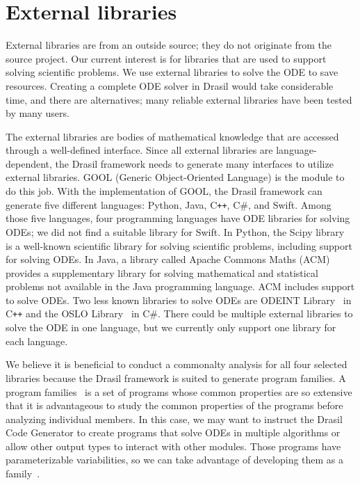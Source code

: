 \chapter{External libraries}
\label{cha_extlib}
External libraries are from an outside source; they do not originate from the source project. Our current interest is for libraries that are used to support solving scientific problems. We use external libraries to solve the ODE to save resources. Creating a complete ODE solver in Drasil would take considerable time, and there are alternatives; many reliable external libraries have been tested by many users. 

The external libraries are bodies of mathematical knowledge that are accessed through a well-defined interface. Since all external libraries are language-dependent, the Drasil framework needs to generate many interfaces to utilize external libraries. GOOL (Generic Object-Oriented Language) is the module to do this job. With the implementation of GOOL, the Drasil framework can generate five different languages: Python, Java, C\texttt{++}, C\#, and Swift. Among those five languages, four programming languages have ODE libraries for solving ODEs; we did not find a suitable library for Swift. In Python, the Scipy library~\citep{scipy} is a well-known scientific library for solving scientific problems, including support for solving ODEs. In Java, a library called Apache Commons Maths (ACM)~\citep{apache} provides a supplementary library for solving mathematical and statistical problems not available in the Java programming language. ACM includes support to solve ODEs. Two less known libraries to solve ODEs are ODEINT Library~\citep{odeint} in C\texttt{++} and the OSLO Library~\citep{oslo} in C\#. There could be multiple external libraries to solve the ODE in one language, but we currently only support one library for each language.

We believe it is beneficial to conduct a commonalty analysis for all four selected libraries because the Drasil framework is suited to generate program families. A program families~\citep{dp1976} is a set of programs whose common properties are so extensive that it is advantageous to study the common properties of the programs before analyzing individual members. In this case, we may want to instruct the Drasil Code Generator to create programs that solve ODEs in multiple algorithms or allow other output types to interact with other modules. Those programs have parameterizable variabilities, so we can take advantage of developing them as a family~\citep{ss2004}.


